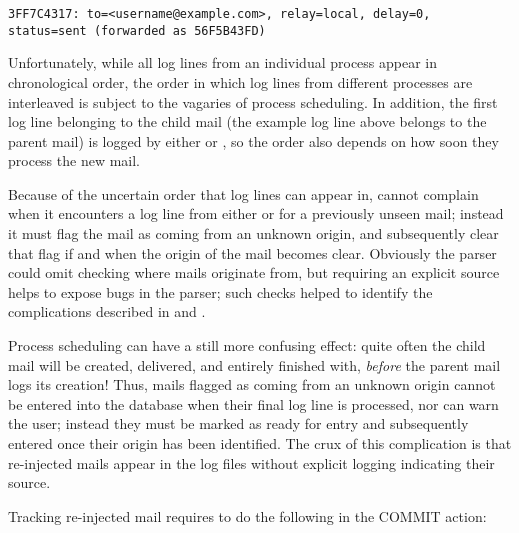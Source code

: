 \texttt{3FF7C4317: to=<username@example.com>, relay=local, \hfill{}
\newline{} \tab{} \tab{} delay=0, status=sent (forwarded as 56F5B43FD)}

Unfortunately, while all log lines from an individual process appear in
chronological order, the order in which log lines from different processes
are interleaved is subject to the vagaries of process scheduling.  In
addition, the first log line belonging to the child mail (the example log
line above belongs to the parent mail) is logged by either  or
, so the order also depends on how soon they process the
new mail.

Because of the uncertain order that log lines can appear in, \parsername{}
cannot complain when it encounters a log line from either  or
 for a previously unseen mail; instead it must flag the
mail as coming from an unknown origin, and subsequently clear that flag if
and when the origin of the mail becomes clear.  Obviously the parser could
omit checking where mails originate from, but requiring an explicit source
helps to expose bugs in the parser; such checks helped to identify the
complications described in  and
.

Process scheduling can have a still more confusing effect: quite often the
child mail will be created, delivered, and entirely finished with,
\textit{before\/} the parent mail logs its creation!  Thus, mails flagged
as coming from an unknown origin cannot be entered into the database when
their final log line is processed, nor can \parsername{} warn the user;
instead they must be marked as ready for entry and subsequently entered
once their origin has been identified.  The crux of this complication is
that re-injected mails appear in the log files without explicit logging
indicating their source.

Tracking re-injected mail requires \parsername{} to do the following in the
COMMIT action:

